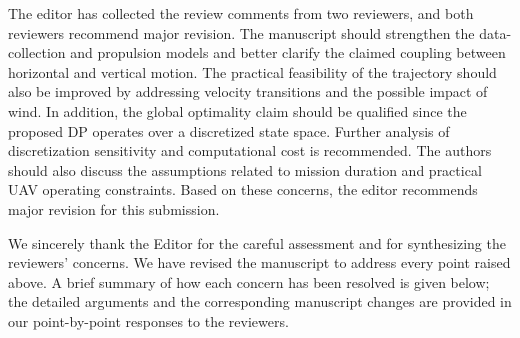 \editor

\begin{generalcomment}
	The editor has collected the review comments from two reviewers, and both reviewers recommend major revision. The manuscript should strengthen the data-collection and propulsion models and better clarify the claimed coupling between horizontal and vertical motion. The practical feasibility of the trajectory should also be improved by addressing velocity transitions and the possible impact of wind. In addition, the global optimality claim should be qualified since the proposed DP operates over a discretized state space. Further analysis of discretization sensitivity and computational cost is recommended. The authors should also discuss the assumptions related to mission duration and practical UAV operating constraints. Based on these concerns, the editor recommends major revision for this submission.
\end{generalcomment}

We sincerely thank the Editor for the careful assessment and for synthesizing the reviewers' concerns. We have revised the manuscript to address every point raised above. A brief summary of how each concern has been resolved is given below; the detailed arguments and the corresponding manuscript changes are provided in our point-by-point responses to the reviewers.

